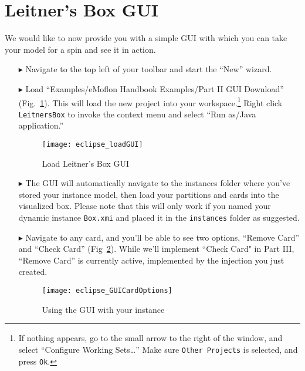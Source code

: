 \newpage
\section{Leitner's Box GUI}
\genHeader

We would like to now provide you with a simple GUI with which you can take your model for a spin and see it in action.

\begin{itemize}

\item[$\blacktriangleright$] Navigate to the top left of your toolbar and start the ``New'' wizard.

\item[$\blacktriangleright$] Load ``Examples/eMoflon Handbook Examples/Part II GUI Download'' (Fig.~\ref{eclipse:GUI_load}). This will load the new project
into your workspace.\footnote{If nothing appears, go to the small arrow to the right of the window, and select ``Configure Working Sets\ldots'' Make sure
\texttt{Other Projects} is selected, and press \texttt{Ok}.} Right click \texttt{LeitnersBox} to invoke the context menu and select ``Run as/Java application.''

\begin{figure}[htbp]
    \centering
    \texttt{[image: eclipse\_loadGUI]}
    \caption{Load Leitner's Box GUI}
    \label{eclipse:GUI_load}
\end{figure}

\clearpage

\item[$\blacktriangleright$] The GUI will automatically navigate to the instances folder where you've stored your instance model, then load your partitions and
cards into the visualized box. Please note that this will only work if you named your dynamic instance \texttt{Box.xmi} and placed it in the \texttt{instances}
folder as suggested.

\vspace{0.5cm}

\item[$\blacktriangleright$] Navigate to any card, and you'll be able to see two options, ``Remove Card'' and ``Check Card''
(Fig~\ref{eclipse:GUI_cardOptions}). While we'll implement ``Check Card" in Part III, ``Remove Card'' is currently active, implemented by the injection you
just created.

\vspace{1cm}

\begin{figure}[htbp]
    \centering
    \texttt{[image: eclipse\_GUICardOptions]}
    \caption{Using the GUI with your instance}
    \label{eclipse:GUI_cardOptions}
\end{figure}


\end{itemize}
